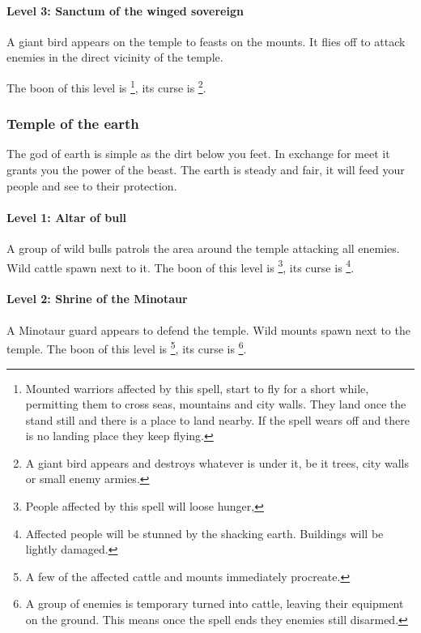 \documentclass[a4paper]{book}
\begin{document}
\paragraph{Level 3: Sanctum of the winged sovereign}
A giant bird appears on the temple to feasts on the mounts. It flies off to
attack enemies in the direct vicinity of the temple.

The boon of this level is \footnote{ Mounted warriors
	affected by this spell, start to fly for a short while, permitting them to
	cross seas, mountains and city walls. They land once the stand still and there
	is a place to land nearby. If the spell wears off and there is no landing place
	they keep flying. }, its curse is \footnote{ A giant
	bird appears and destroys whatever is under it, be it trees, city walls or
	small enemy armies. }.

\subsubsection{Temple of the earth}
The god of earth is simple as the dirt below you feet. In exchange for meet it
grants you the power of the beast. The earth is steady and fair, it will feed
your people and see to their protection.

\paragraph{Level 1: Altar of bull}
A group of wild bulls patrols the area around the temple attacking all enemies.
Wild cattle spawn next to it. The boon of this level is \footnote{ People affected by this spell will loose hunger, }, its
curse is \footnote{ Affected people will be stunned by the
	shacking earth. Buildings will be lightly damaged. }.

\paragraph{Level 2: Shrine of the Minotaur}
A Minotaur guard appears to defend the temple. Wild mounts spawn next to the
temple. The boon of this level is \footnote{ A few of the
	affected cattle and mounts immediately procreate. }, its curse is
\footnote{ A group of enemies is temporary turned
	into cattle, leaving their equipment on the ground. This means once the spell
	ends they enemies still disarmed. }.
\end{document}
